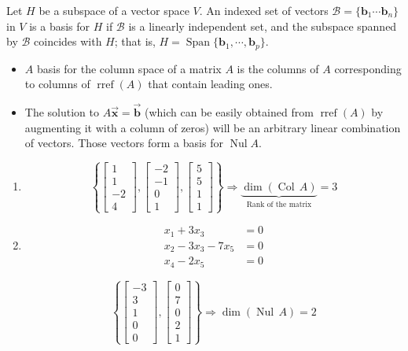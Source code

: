 \documentclass[letter,11pt]{article}
\begin{document}
\begin{tcolorbox}[boxrule=1mm, width=(.9\linewidth),before=\hfill,after=\hfill,adjusted title={Problem 6 Solutions}]
Let $H$ be a subspace of a vector space $V$. An indexed set of vectors $\mathcal{B} = \{\boldsymbol{b}_{1}\cdots \boldsymbol{b}_{n}\}$ in $V$ is a basis for $H$ if $\mathcal{B}$ is a linearly independent set, and the subspace spanned by $\mathcal{B}$ coincides with $H$; that is, $H = \operatorname{Span} \{\boldsymbol{b}_{1}, \cdots, \boldsymbol{b}_{p}\}$.

\begin{itemize}
    \item $A$ basis for the column space of a matrix $A$ is the columns of $A$ corresponding to columns of $\operatorname{rref}(A)$ that contain leading ones.
    \item The solution to $A\vec{\boldsymbol{x}} = \vec{\boldsymbol{b}}$ (which can be easily obtained from $\operatorname{rref}(A)$ by augmenting it with a column of zeros) will be an arbitrary linear combination of vectors. Those vectors form a basis for $\operatorname{Nul} A$.
\end{itemize}
\tcblower
\begin{enumerate}[label = \roman*.]
    \item $$\left\{\begin{bmatrix}1\\1\\-2\\4 \end{bmatrix},\begin{bmatrix}-2\\-1\\0\\1 \end{bmatrix},\begin{bmatrix}5\\5\\1\\1 \end{bmatrix} \right\} \Longrightarrow \underbrace{\operatorname{dim}(\operatorname{Col} \, A)}_{\text{Rank of the matrix}}  = 3 $$
    \item 
        \begin{align*}
            x_{1}+3x_{3} &= 0\\
            x_{2}-3x_{3}-7x_{5} &=0\\
            x_{4}-2x_{5} &=0
        \end{align*}
        
 $$\left\{\begin{bmatrix}-3\\3\\1\\0\\0 \end{bmatrix},\begin{bmatrix}0\\7\\0\\2\\1 \end{bmatrix} \right\} \Longrightarrow \operatorname{dim}(\operatorname{Nul} \, A) = 2 $$
\end{enumerate}
\end{tcolorbox}
\end{document}
